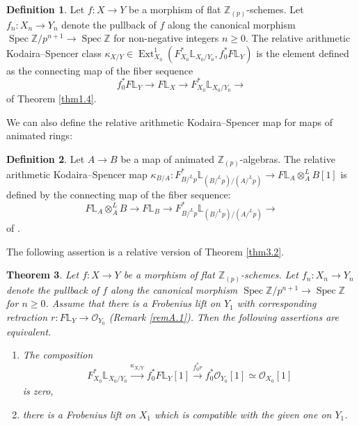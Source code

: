 \documentclass[11pt, a4paper]{amsart}
\theoremstyle{plain}
\newtheorem{theorem}{Theorem}[section]
\theoremstyle{definition}
\newtheorem{definition}[theorem]{Definition}
\begin{document}
\begin{definition}
    Let $f:X\to Y$ be a morphism of flat $\mathbb Z_{(p)}$-schemes. Let $f_n:X_n\to Y_n$ denote the pullback of $f$ along the canonical morphism $\operatorname{Spec}\mathbb Z/p^{n+1}\to \operatorname{Spec}\mathbb Z$ for non-negative integers $n\ge0$. The relative arithmetic Kodaira--Spencer class $\kappa_{X/Y}\in \operatorname{Ext}_{X_0}^1(F_{X_0}^*\mathbb L_{X_0/Y_0},f_0^*F\mathbb L_Y)$ is the element defined as the connecting map of the fiber sequence\[f_0^*F\mathbb L_Y\to F\mathbb L_X\to F_{X_0}^*\mathbb L_{X_0/Y_0}\to \] of Theorem \ref{thm1.4}.
\end{definition}
We can also define the relative arithmetic Kodaira--Spencer map for maps of animated rings:
\begin{definition}
    Let $A\to B$ be a map of animated $\mathbb Z_{(p)}$-algebras. The relative arithmetic Kodaira--Spencer map $\kappa_{B/A}:F_{B/^Lp}^*\mathbb L_{(B/^Lp)/(A/^Lp)}\to F\mathbb L_A\otimes_A^LB[1]$ is defined by the connecting map of the fiber sequence:\[F\mathbb L_A\otimes_A^LB\to F\mathbb L_B\to F_{B/^Lp}^*\mathbb L_{(B/^Lp)/(A/^Lp)}\to \] of \cite[Theorem 5.3]{Shi26}.
\end{definition}
The following assertion is a relative version of Theorem \ref{thm3.2}.
\begin{theorem}\label{thm3.9}
    Let $f:X\to Y$ be a morphism of flat $\mathbb Z_{(p)}$-schemes. Let $f_n:X_n\to Y_n$ denote the pullback of $f$ along the canonical morphism $\operatorname{Spec}\mathbb Z/p^{n+1}\to \operatorname{Spec}\mathbb Z$ for $n\ge0$. Assume that there is a Frobenius lift on $Y_1$ with corresponding retraction $r:F\mathbb L_Y\to \mathcal O_{Y_0}$ (Remark \ref{remA.1}). Then the following assertions are equivalent.
    \begin{enumerate}
        \item The composition\[F_{X_0}^*\mathbb L_{X_0/Y_0}\xrightarrow[]{\kappa_{X/Y}}f_0^*F\mathbb L_Y[1]\xrightarrow[]{f_0^*r}f_0^*\mathcal O_{Y_0}[1]\simeq \mathcal O_{X_0}[1]\] is zero,
        \item there is a Frobenius lift on $X_1$ which is compatible with the given one on $Y_1$.
    \end{enumerate}
\end{theorem}
\end{document}
